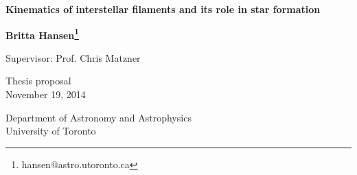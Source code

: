 \documentclass[a4paper,12pt]{article}
\begin{document}
\begin{titlepage}
    \begin{center}
        \vspace*{1cm}
        
        \textbf{Kinematics of interstellar filaments and its role in star formation}
        
        \vspace{1.5cm}
        
        \textbf{Britta Hansen\footnote{hansen@astro.utoronto.ca}}

        \vspace{0.5cm}

        Supervisor: Prof. Chris Matzner
        
        \vfill
        
        Thesis proposal\\
        November 19, 2014
        
        \vspace{0.8cm}
        
        Department of Astronomy and Astrophysics\\
        University of Toronto\\

        
    \end{center}
\end{titlepage}




\begin{abstract}

Recent observations of the dense interstellar medium - the main locale of star formation - have found that filamentary structure is ubiquitous and that filaments are strongly associated with clusters. As such, there is much speculation on the effects of filaments on star formation and on the initial mass function. For my thesis I will examine the kinematics of filaments, and the role that filaments play in cluster scale star formation. To do this, I will be running numerical experiments with the adaptive mesh refinement code RAMSES, and by tweaking dimensionless parameters I will look for causal relations between the parameters and the simulation outcomes. The parameters will come from analytical work of others, such as Matzner \& Jumper 2014. I will work under the supposition that matter accretes onto clusters via filaments, hoping to answer questions such as ``Can filaments be the primary source of cluster mass accretion?" and ``How do different filamentary properties affect the properties of the cluster, and of the stars formed within?". All of my numerical experiments and simulations will be compared to observations and theoretical expectations.

\end{abstract}
\end{document}
